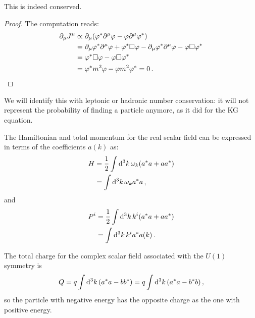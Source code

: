 \documentclass[main.tex]{subfiles}
\begin{document}
\begin{claim}
This is indeed conserved.
\end{claim}

\begin{proof}
The computation reads: 
%
\begin{subequations}
\begin{align}
\partial_{\mu }J^{\mu } &\propto
\partial_{\mu } \qty(\varphi^{*} \partial^{\mu } \varphi 
- \varphi \partial^{\mu } \varphi^{*})  \\
&= \partial_{\mu } \varphi^{*} \partial^{\mu } \varphi  
+ \varphi^{*} \square \varphi 
- \partial_{\mu } \varphi^{*} \partial^{\mu } \varphi 
- \varphi \square \varphi^{*}  \\
&= \varphi^{*} \square \varphi 
- \varphi \square \varphi^{*}   \\
&= \varphi^{*} m^2 \varphi - \varphi m^2 \varphi^{* } = 0
\,.
\end{align}
\end{subequations}
\end{proof}

We will identify this with leptonic or hadronic number conservation: it will not represent the probability of finding a particle anymore, as it did for the KG equation. 

\begin{claim}
The Hamiltonian and total momentum for the real scalar field can be expressed in terms of the coefficients \(a(k)\) as: 
%
\begin{subequations}
\begin{align}
H &=  \frac{1}{2} \int \dd[3]{k} \omega_{k}  \qty(a^{*}a + a a^{*})\\
&= \int \dd[3]{k} \omega_{k} a^{*} a
\,,
\end{align}
\end{subequations}
%
and 
%
\begin{subequations}
\begin{align}
P^{i} &= \frac{1}{2} \int \dd[3]{k} k^{i}  \qty(a^{*}a + a a^{*})\\
&= \int \dd[3]{k} k^{i} a^{*} a(k) 
\,.
\end{align}
\end{subequations}
\end{claim}

\begin{claim}
The total charge for the complex scalar field associated with the \(U(1)\) symmetry is 
%
\begin{align}
Q = q\int \dd[3]{k} \qty(a^{*}a - bb^{*})
= q\int \dd[3]{k} \qty(a^{*}a - b^{*}b)
\,,
\end{align}
%
so the particle with negative energy has the opposite charge as the one with positive energy.
\end{claim}
\end{document}
